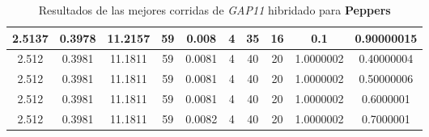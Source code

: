 \begin{table}[h!]
\begin{center}
\begin{tabular}{|c|c|c|c|c|c|c|c|c|c|}
        \hline
        \hline
            2.5137 & 0.3978  & 11.2157 & 59 & 0.008 & 4 & 35 & 16 & 0.1 & 0.90000015\\
        \hline
        \hline
            2.512 & 0.3981  & 11.1811 & 59 & 0.0081 & 4 & 40 & 20 & 1.0000002 & 0.40000004\\
        \hline
        \hline
            2.512 & 0.3981  & 11.1811 & 59 & 0.0081 & 4 & 40 & 20 & 1.0000002 & 0.50000006\\
        \hline
        \hline
            2.512 & 0.3981  & 11.1811 & 59 & 0.0081 & 4 & 40 & 20 & 1.0000002 & 0.6000001\\
        \hline
        \hline
            2.512 & 0.3981  & 11.1811 & 59 & 0.0082 & 4 & 40 & 20 & 1.0000002 & 0.7000001\\
        \hline
        \end{tabular}
        \caption{Resultados de las mejores corridas de \emph{GAP11} hibridado para {\bf Peppers}}
        \label{tb:tableGAP11}
    \end{center}
\end{table}
